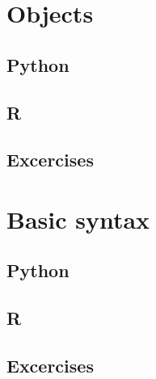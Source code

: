 \documentclass[
  11pt,
]{article}
\begin{document}
\section{Objects}\label{objects}

\subsection{Python}\label{python-1}

\subsection{R}\label{r-1}

\subsection{Excercises}\label{excercises}

\section{Basic syntax}\label{basic-syntax}

\subsection{Python}\label{python-2}

\subsection{R}\label{r-2}

\subsection{Excercises}\label{excercises-1}
\end{document}
